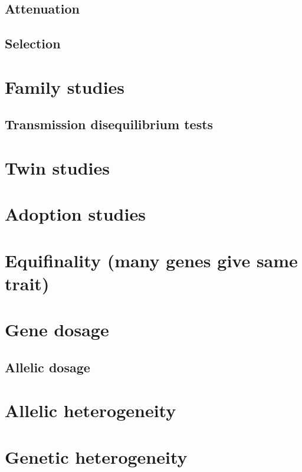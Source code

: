 \documentclass[]{book}
\theoremstyle{definition}
\theoremstyle{definition}
\theoremstyle{definition}
\theoremstyle{remark}
\begin{document}
\subsection{Attenuation}\label{attenuation}

\subsection{Selection}\label{selection}

\section{Family studies}\label{family-studies}

\subsection{Transmission disequilibrium
tests}\label{transmission-disequilibrium-tests}

\section{Twin studies}\label{twin-studies-1}

\section{Adoption studies}\label{adoption-studies}

\section{Equifinality (many genes give same
trait)}\label{equifinality-many-genes-give-same-trait}

\section{Gene dosage}\label{gene-dosage}

\subsection{Allelic dosage}\label{allelic-dosage}

\section{Allelic heterogeneity}\label{allelic-heterogeneity}

\section{Genetic heterogeneity}\label{genetic-heterogeneity}
\end{document}
